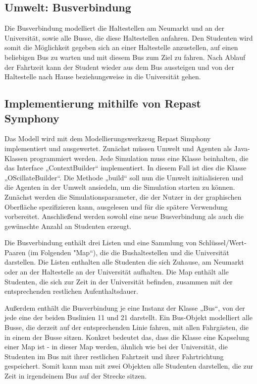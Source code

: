\documentclass[12pt,a4paper]{scrartcl}
\begin{document}
\subsection{Umwelt: Busverbindung}\label{bus}
Die Busverbindung modelliert die Haltestellen am Neumarkt und an der Universität, sowie alle Busse, die diese Haltestellen anfahren. Den Studenten wird somit die Möglichkeit gegeben sich an einer Haltestelle anzustellen, auf einen beliebigen Bus zu warten und mit diesem Bus zum Ziel zu fahren. Nach Ablauf der Fahrtzeit kann der Student wieder aus dem Bus aussteigen und von der Haltestelle nach Hause beziehungsweise in die Universität gehen. 

\subsection{Implementierung mithilfe von Repast Symphony}\label{repast}
Das Modell wird mit dem Modellierungswerkzeug Repast Simphony implementiert und ausgewertet. Zunächst müssen Umwelt und Agenten als Java-Klassen programmiert werden. Jede Simulation muss eine Klasse beinhalten, die das Interface „ContextBuilder“ implementiert. In diesem Fall ist dies die Klasse „OScillateBuilder“. Die Methode „build“ soll nun die Umwelt initialisieren und die Agenten in der Umwelt ansiedeln, um die Simulation starten zu können. Zunächst werden die Simulationsparameter, die der Nutzer in der graphischen Oberfläche spezifizieren kann, ausgelesen und für die spätere Verwendung vorbereitet. Anschließend werden sowohl eine neue Busverbindung als auch die gewünschte Anzahl an Studenten erzeugt.

Die Busverbindung enthält drei Listen und eine Sammlung von Schlüssel/Wert-Paaren (im Folgenden "Map“), die die Bushaltestellen und die Universität darstellen. Die Listen enthalten alle Studenten die sich Zuhause, am Neumarkt oder an der Haltestelle an der Universität aufhalten. Die Map enthält alle Studenten, die sich zur Zeit in der Universität befinden, zusammen mit der entsprechenden restlichen Aufenthaltsdauer.

Außerdem enthält die Busverbindung je eine Instanz der Klasse „Bus“, von der jede eine der beiden Buslinien 11 und 21 darstellt. Ein Bus-Objekt modelliert alle Busse, die derzeit auf der entsprechenden Linie fahren, mit allen Fahrgästen, die in einem der Busse sitzen. Konkret bedeutet das, dass die Klasse eine Kapselung einer Map ist - in dieser Map werden, ähnlich wie bei der Universität, die Studenten im Bus mit ihrer restlichen Fahrtzeit und ihrer Fahrtrichtung gespeichert. Somit kann man mit zwei Objekten alle Studenten darstellen, die zur Zeit in irgendeinem Bus auf der Strecke sitzen.
\end{document}
